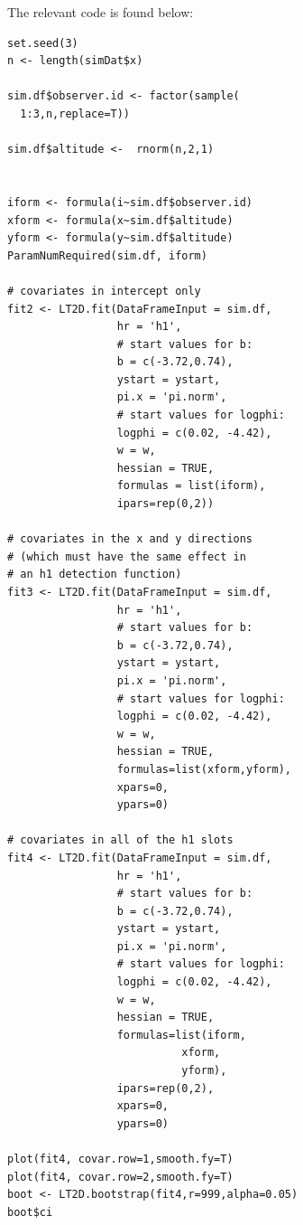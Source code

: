 \documentclass[11pt]{article}
\begin{document}
\begin{multicols}{2}
The relevant code is found below:
\begingroup
\scriptsize
\begin{lstlisting}
set.seed(3)
n <- length(simDat$x)

sim.df$observer.id <- factor(sample(
  1:3,n,replace=T))

sim.df$altitude <-  rnorm(n,2,1)


iform <- formula(i~sim.df$observer.id)
xform <- formula(x~sim.df$altitude)
yform <- formula(y~sim.df$altitude)
ParamNumRequired(sim.df, iform)

# covariates in intercept only
fit2 <- LT2D.fit(DataFrameInput = sim.df,
                 hr = 'h1',
                 # start values for b:
                 b = c(-3.72,0.74),
                 ystart = ystart,
                 pi.x = 'pi.norm',
                 # start values for logphi:
                 logphi = c(0.02, -4.42),
                 w = w,
                 hessian = TRUE,
                 formulas = list(iform),
                 ipars=rep(0,2))

# covariates in the x and y directions
# (which must have the same effect in 
# an h1 detection function)
fit3 <- LT2D.fit(DataFrameInput = sim.df,
                 hr = 'h1',
                 # start values for b:
                 b = c(-3.72,0.74),
                 ystart = ystart,
                 pi.x = 'pi.norm',
                 # start values for logphi:
                 logphi = c(0.02, -4.42),
                 w = w,
                 hessian = TRUE,
                 formulas=list(xform,yform),
                 xpars=0,
                 ypars=0)

# covariates in all of the h1 slots
fit4 <- LT2D.fit(DataFrameInput = sim.df,
                 hr = 'h1',
                 # start values for b:
                 b = c(-3.72,0.74),
                 ystart = ystart,
                 pi.x = 'pi.norm',
                 # start values for logphi:
                 logphi = c(0.02, -4.42),
                 w = w,
                 hessian = TRUE,
                 formulas=list(iform,
                  	       xform,
                 	       yform),
                 ipars=rep(0,2),
                 xpars=0,
                 ypars=0)
                 
plot(fit4, covar.row=1,smooth.fy=T)
plot(fit4, covar.row=2,smooth.fy=T)
boot <- LT2D.bootstrap(fit4,r=999,alpha=0.05)
boot$ci
\end{lstlisting}
\endgroup


\end{multicols}
\end{document}
